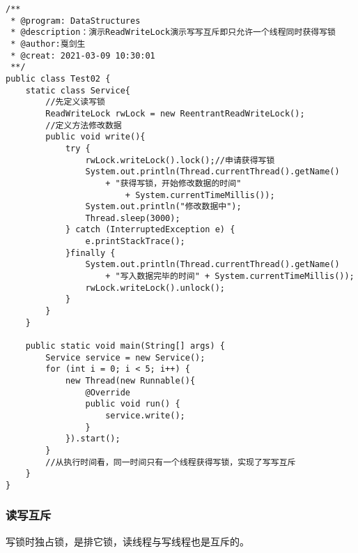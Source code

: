 \documentclass[a4paper]{report}
\begin{document}
\begin{Verbatim}[frame=single,numbersep=5pt,xleftmargin=1.5em,xrightmargin=1.5em]
/**
 * @program: DataStructures
 * @description：演示ReadWriteLock演示写写互斥即只允许一个线程同时获得写锁
 * @author:戛剑生
 * @creat: 2021-03-09 10:30:01
 **/
public class Test02 {
    static class Service{
        //先定义读写锁
        ReadWriteLock rwLock = new ReentrantReadWriteLock();
        //定义方法修改数据
        public void write(){
            try {
                rwLock.writeLock().lock();//申请获得写锁
                System.out.println(Thread.currentThread().getName()
                    + "获得写锁，开始修改数据的时间"
                        + System.currentTimeMillis());
                System.out.println("修改数据中");
                Thread.sleep(3000);
            } catch (InterruptedException e) {
                e.printStackTrace();
            }finally {
                System.out.println(Thread.currentThread().getName()
                    + "写入数据完毕的时间" + System.currentTimeMillis());
                rwLock.writeLock().unlock();
            }
        }
    }

    public static void main(String[] args) {
        Service service = new Service();
        for (int i = 0; i < 5; i++) {
            new Thread(new Runnable(){
                @Override
                public void run() {
                    service.write();
                }
            }).start();
        }
        //从执行时间看，同一时间只有一个线程获得写锁，实现了写写互斥
    }
}\end{Verbatim}
\subsubsection{读写互斥}
写锁时独占锁，是排它锁，读线程与写线程也是互斥的。
\end{document}
